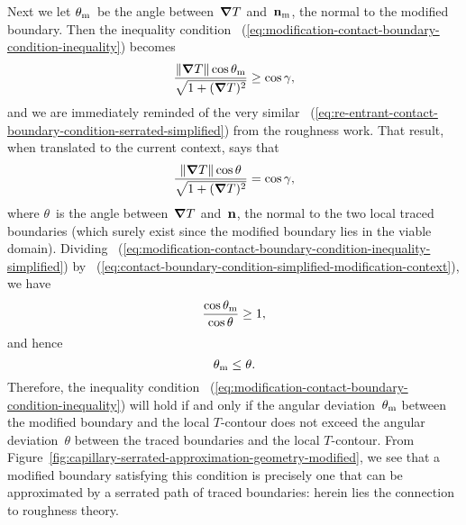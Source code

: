 Next we let $\theta_{\mathrm{m}}$~be the angle between~$\mathop{}\!\boldsymbol{\mathbf{\nabla}} T$
and~$\mathop{}\!\boldsymbol{\mathbf{n}}_{\mathrm{m}}$, the normal to the modified boundary.
Then the inequality condition~%
  (\ref{eq:modification-contact-boundary-condition-inequality})
becomes
\begin{equation}
  \frac{\lVert\mathop{}\!\boldsymbol{\mathbf{\nabla}} T\rVert \cos\theta_{\mathrm{m}}}{\sqrt{1 + (\mathop{}\!\boldsymbol{\mathbf{\nabla}} T)^2}} \ge \cos\gamma,
  \label{eq:modification-contact-boundary-condition-inequality-simplified}
\end{equation}
and we are immediately reminded of the very similar~%
  (\ref{eq:re-entrant-contact-boundary-condition-serrated-simplified})
from the roughness work.
That result, when translated to the current context,
says that
\begin{equation}
  \frac{\lVert\mathop{}\!\boldsymbol{\mathbf{\nabla}} T\rVert \cos\theta}{\sqrt{1 + (\mathop{}\!\boldsymbol{\mathbf{\nabla}} T)^2}} = \cos\gamma,
  \label{eq:contact-boundary-condition-simplified-modification-context}
\end{equation}
where $\theta$~is the angle between~$\mathop{}\!\boldsymbol{\mathbf{\nabla}} T$ and~$\mathop{}\!\boldsymbol{\mathbf{n}}$,
the normal to the two local traced boundaries
(which surely exist since the modified boundary lies in the viable domain).
Dividing~%
  (\ref{eq:modification-contact-boundary-condition-inequality-simplified})
by~%
  (\ref{eq:contact-boundary-condition-simplified-modification-context}),
we have
\begin{equation}
  \frac{\cos\theta_{\mathrm{m}}}{\cos\theta} \ge 1,
  \label{eq:modification-cosine-ratio-inequality}
\end{equation}
and hence
\begin{equation}
  \theta_{\mathrm{m}} \le \theta.
  \label{eq:modification-deviation-bound}
\end{equation}
Therefore, the inequality condition~%
  (\ref{eq:modification-contact-boundary-condition-inequality})
will hold if and only if
the angular deviation~$\theta_{\mathrm{m}}$
between the modified boundary and the local $T$-contour
does not exceed the angular deviation~$\theta$
between the traced boundaries and the local $T$-contour.
From Figure~\ref{fig:capillary-serrated-approximation-geometry-modified},
we see that a modified boundary satisfying this condition
is precisely one that can be approximated
by a serrated path of traced boundaries:
herein lies the connection to roughness theory.

\begin{figure}
\end{figure}

